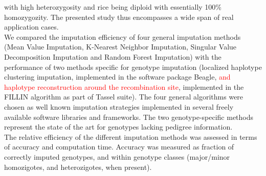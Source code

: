 with high heterozygosity and rice being diploid with essentially 100\% homozygozity.
The presented study thus encompasses a wide span of real application cases.\\
We compared the imputation efficiency of four general imputation methods (Mean
Value Imputation, K-Nearest Neighbor Imputation, Singular Value Decomposition
Imputation and Random Forest Imputation) with the performance of two methods specific 
for genotype imputation (localized haplotype clustering imputation, 
implemented in the software package Beagle, \textcolor{red}{and haplotype
reconstruction around the recombination site}, implemented in the FILLIN algorithm
as part of Tassel suite). The four general algorithms were chosen as well known 
imputation strategies implemented in several freely available software libraries
and frameworks. The two genotype-specific methods represent the state of the art 
for genotypes lacking pedigree information.\\
The relative efficiency of the different imputation methods was assessed in terms of 
accuracy and computation time. Accuracy was measured as fraction of 
correctly imputed genotypes, and within genotype classes 
(major/minor homozigotes, and heterozigotes, when present).

